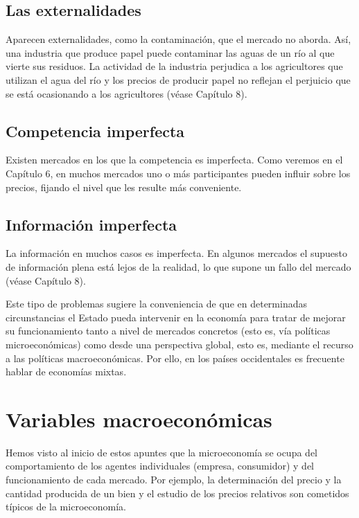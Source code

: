 \documentclass[
]{krantz}
\begin{document}
\hypertarget{las-externalidades}{%
\section{Las externalidades}\label{las-externalidades}}

Aparecen externalidades, como la contaminación, que el mercado no aborda. Así, una industria que produce papel puede contaminar las aguas de un río al que vierte sus residuos. La actividad de la industria perjudica a los agricultores que utilizan el agua del río y los precios de producir papel no reflejan el perjuicio que se está ocasionando a los agricultores (véase Capítulo 8).

\hypertarget{competencia-imperfecta}{%
\section{Competencia imperfecta}\label{competencia-imperfecta}}

Existen mercados en los que la competencia es imperfecta. Como veremos en el Capítulo 6, en muchos mercados uno o más participantes pueden influir sobre los precios, fijando el nivel que les resulte más conveniente.

\hypertarget{informaciuxf3n-imperfecta}{%
\section{Información imperfecta}\label{informaciuxf3n-imperfecta}}

La información en muchos casos es imperfecta. En algunos mercados el supuesto de información plena está lejos de la realidad, lo que supone un fallo del mercado (véase Capítulo 8).

Este tipo de problemas sugiere la conveniencia de que en determinadas circunstancias el Estado pueda intervenir en la economía para tratar de mejorar su funcionamiento tanto a nivel de mercados concretos (esto es, vía políticas microeconómicas) como desde una perspectiva global, esto es, mediante el recurso a las políticas macroeconómicas. Por ello, en los países occidentales es frecuente hablar de economías mixtas.

\hypertarget{variables-macroeconuxf3micas}{%
\chapter{Variables macroeconómicas}\label{variables-macroeconuxf3micas}}

Hemos visto al inicio de estos apuntes que la microeconomía se ocupa del comportamiento de los agentes individuales (empresa, consumidor) y del funcionamiento de cada mercado. Por ejemplo, la determinación del precio y la cantidad producida de un bien y el estudio de los precios relativos son cometidos típicos de la microeconomía.
\end{document}
